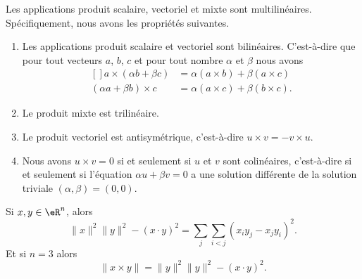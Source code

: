 \begin{proposition}     \label{PropScalMixtLin}
    Les applications produit scalaire, vectoriel et mixte sont multilinéaires. Spécifiquement, nous avons les propriétés suivantes.
    \begin{enumerate}
        \item
        Les applications produit scalaire et vectoriel sont bilinéaires. C'est-à-dire que pour tout vecteurs $a$, $b$, $c$ et pour tout nombre $\alpha$ et $\beta$ nous avons
        \begin{equation}
            \begin{aligned}[]
                a\times (\alpha b +\beta c) & =\alpha(a\times b)+\beta(a\times c)\\
                (\alpha a+\beta b)\times c  & =\alpha(a\times c)+\beta(b\times c).
            \end{aligned}
        \end{equation}

        \item
            Le produit mixte est trilinéaire.
        \item
            Le produit vectoriel est antisymétrique, c'est-à-dire \( u\times v=-v\times u\).
        \item
            Nous avons \( u\times v=0\) si et seulement si \( u\) et \( v\) sont colinéaires, c'est-à-dire si et seulement si l'équation \( \alpha u+\beta v=0\) a une solution différente de la solution triviale \( (\alpha,\beta)=(0,0)\).
        \end{enumerate}
\end{proposition}

\begin{proposition}     \label{PROPooMXAIooJureOD}
    Si \( x,y\in \eR^n\), alors
    \begin{equation}
        \| x \|^2\| y \|^2-(x\cdot y)^2=\sum_j\sum_{i<j}(x_iy_j-x_jy_i)^2.
    \end{equation}
    Et si \( n=3\) alors
    \begin{equation}
        \| x\times y \|=\| y \|^2\| y \|^2-(x\cdot y)^2.
    \end{equation}
\end{proposition}

